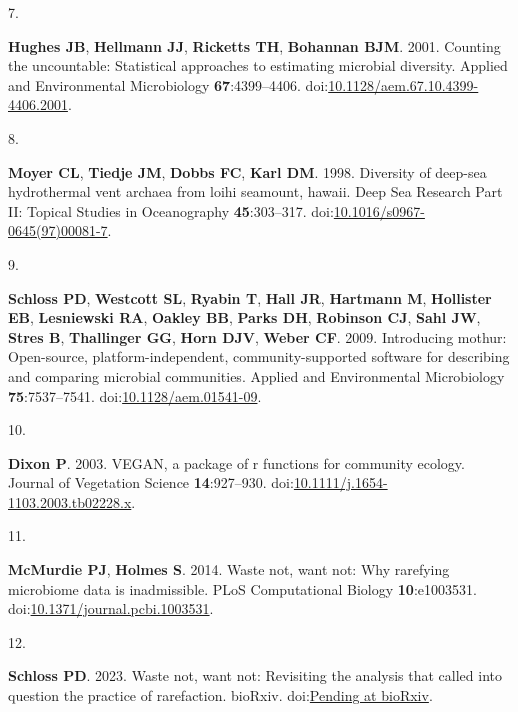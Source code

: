 \documentclass[
]{article}
\newlength{\cslhangindent}
\newlength{\csllabelwidth}
\newlength{\cslentryspacingunit} %
\newenvironment{CSLReferences}[2] %
 {%
  \setlength{\parindent}{0pt}
  \ifodd #1
  \let\oldpar\par
  \def\par{\hangindent=\cslhangindent\oldpar}
  \fi
  \setlength{\parskip}{#2\cslentryspacingunit}
 }%
 {}
\newcommand{\CSLLeftMargin}[1]{\parbox[t]{\csllabelwidth}{#1}}
\newcommand{\CSLRightInline}[1]{\parbox[t]{\linewidth - \csllabelwidth}{#1}\break}
\begin{document}
\begin{CSLReferences}{0}{1}
\leavevmode{}%
\CSLLeftMargin{7. }%
\CSLRightInline{\textbf{Hughes JB}, \textbf{Hellmann JJ},
\textbf{Ricketts TH}, \textbf{Bohannan BJM}. 2001. Counting the
uncountable: Statistical approaches to estimating microbial diversity.
Applied and Environmental Microbiology \textbf{67}:4399--4406.
doi:\href{https://doi.org/10.1128/aem.67.10.4399-4406.2001}{10.1128/aem.67.10.4399-4406.2001}.}

\leavevmode{}%
\CSLLeftMargin{8. }%
\CSLRightInline{\textbf{Moyer CL}, \textbf{Tiedje JM}, \textbf{Dobbs
FC}, \textbf{Karl DM}. 1998. Diversity of deep-sea hydrothermal vent
archaea from loihi seamount, hawaii. Deep Sea Research Part {II}:
Topical Studies in Oceanography \textbf{45}:303--317.
doi:\href{https://doi.org/10.1016/s0967-0645(97)00081-7}{10.1016/s0967-0645(97)00081-7}.}

\leavevmode{}%
\CSLLeftMargin{9. }%
\CSLRightInline{\textbf{Schloss PD}, \textbf{Westcott SL},
\textbf{Ryabin T}, \textbf{Hall JR}, \textbf{Hartmann M},
\textbf{Hollister EB}, \textbf{Lesniewski RA}, \textbf{Oakley BB},
\textbf{Parks DH}, \textbf{Robinson CJ}, \textbf{Sahl JW}, \textbf{Stres
B}, \textbf{Thallinger GG}, \textbf{Horn DJV}, \textbf{Weber CF}. 2009.
Introducing mothur: Open-source, platform-independent,
community-supported software for describing and comparing microbial
communities. Applied and Environmental Microbiology
\textbf{75}:7537--7541.
doi:\href{https://doi.org/10.1128/aem.01541-09}{10.1128/aem.01541-09}.}

\leavevmode{}%
\CSLLeftMargin{10. }%
\CSLRightInline{\textbf{Dixon P}. 2003. {VEGAN}, a package of r
functions for community ecology. Journal of Vegetation Science
\textbf{14}:927--930.
doi:\href{https://doi.org/10.1111/j.1654-1103.2003.tb02228.x}{10.1111/j.1654-1103.2003.tb02228.x}.}

\leavevmode{}%
\CSLLeftMargin{11. }%
\CSLRightInline{\textbf{McMurdie PJ}, \textbf{Holmes S}. 2014. Waste
not, want not: Why rarefying microbiome data is inadmissible. {PLoS}
Computational Biology \textbf{10}:e1003531.
doi:\href{https://doi.org/10.1371/journal.pcbi.1003531}{10.1371/journal.pcbi.1003531}.}

\leavevmode{}%
\CSLLeftMargin{12. }%
\CSLRightInline{\textbf{Schloss PD}. 2023. Waste not, want not:
Revisiting the analysis that called into question the practice of
rarefaction. bio{R}xiv.
doi:\href{https://doi.org/Pending\%20at\%20bioRxiv}{Pending at
bioRxiv}.}


\end{CSLReferences}
\end{document}
